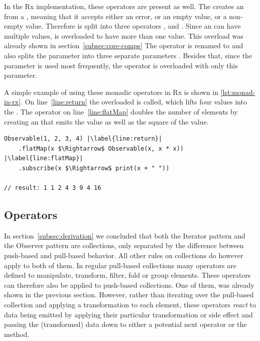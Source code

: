 In the Rx implementation, these operators are present as well. The  creates an \obs from a , meaning that it accepts either an error, or an empty value, or a non-empty value. Therefore  is split into three operators ,  and . Since an \obs can have multiple values,  is overloaded to have more than one value. This overload was already shown in section~\ref{subsec:core-comps} The \code{(>>=)} operator is renamed to  and also splits the  parameter into three separate parameters \cite{rx-api}. Besides that, since the  parameter is used most frequently, the  operator is overloaded with only this parameter.

A simple example of using these monadic operators in Rx is shown in \autoref{lst:monad-in-rx}. On line~\ref{line:return} the overloaded  is called, which lifts four values into the \obs. The  operator on line~\ref{line:flatMap} doubles the number of elements by creating an \obs that emits the value as well as the square of the value.

\begin{minipage}{\linewidth}
\begin{lstlisting}[style=ScalaStyle, caption={Monad operators in Rx}, label={lst:monad-in-rx}]
Observable(1, 2, 3, 4) |\label{line:return}|
    .flatMap(x $\Rightarrow$ Observable(x, x * x)) |\label{line:flatMap}|
    .subscribe(x $\Rightarrow$ print(x + " "))

// result: 1 1 2 4 3 9 4 16
\end{lstlisting}
\end{minipage}

\subsection{Operators}
\label{subsec:operators}
In section~\ref{subsec:derivation} we concluded that both the Iterator pattern and the Observer pattern are collections, only separated by the difference between push-based and pull-based behavior. All other rules on collections do however apply to both of them. In regular pull-based collections many operators are defined to manipulate, transform, filter, fold or group elements. These operators can therefore also be applied to push-based collections. One of them,  was already shown in the previous section. However, rather than iterating over the pull-based collection and applying a transformation to each element, these operators \emph{react} to data being emitted by applying their particular transformation or side effect and passing the (transformed) data down to either a potential next operator or the  method.

